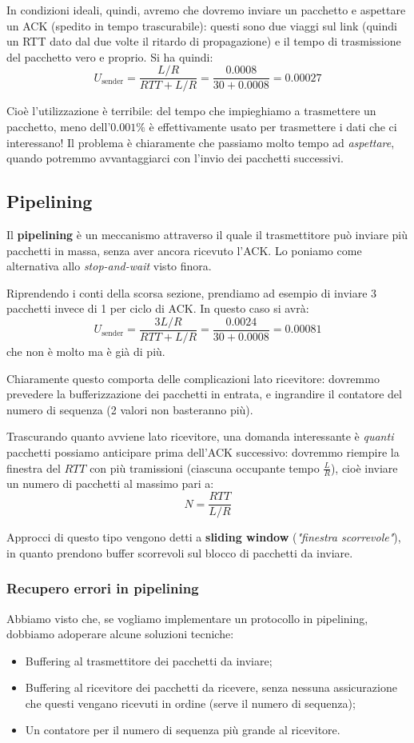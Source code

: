 \documentclass[a4paper,11pt]{article}
\begin{document}
In condizioni ideali, quindi, avremo che dovremo inviare un pacchetto e aspettare un ACK (spedito in tempo trascurabile): questi sono due viaggi sul link (quindi un RTT dato dal due volte il ritardo di propagazione) e il tempo di trasmissione del pacchetto vero e proprio.
Si ha quindi:
$$
U_{\text{sender}} = \frac{ L/R }{ RTT + L/R } = \frac{0.0008}{30 + 0.0008} = 0.00027
$$

Cioè l'utilizzazione è terribile: del tempo che impieghiamo a trasmettere un pacchetto, meno dell'$0.001\%$ è effettivamente usato per trasmettere i dati che ci interessano!
Il problema è chiaramente che passiamo molto tempo ad \textit{aspettare}, quando potremmo avvantaggiarci con l'invio dei pacchetti successivi.

\subsection{Pipelining}
Il \textbf{pipelining} è un meccanismo attraverso il quale il trasmettitore può inviare più pacchetti in massa, senza aver ancora ricevuto l'ACK.
Lo poniamo come alternativa allo \textit{stop-and-wait} visto finora.

Riprendendo i conti della scorsa sezione, prendiamo ad esempio di inviare 3 pacchetti invece di 1 per ciclo di ACK. In questo caso si avrà:
$$
U_{\text{sender}} = \frac{ 3 L/R }{ RTT + L/R } = \frac{0.0024}{30 + 0.0008} = 0.00081
$$
che non è molto ma è già di più.

Chiaramente questo comporta delle complicazioni lato ricevitore: dovremmo prevedere la bufferizzazione dei pacchetti in entrata, e ingrandire il contatore del numero di sequenza (2 valori non basteranno più).

Trascurando quanto avviene lato ricevitore, una domanda interessante è \textit{quanti} pacchetti possiamo anticipare prima dell'ACK successivo: dovremmo riempire la finestra del $RTT$ con più tramissioni (ciascuna occupante tempo $\frac{L}{R}$), cioè inviare un numero di pacchetti al massimo pari a:
$$
N = \frac{RTT}{L / R}
$$

Approcci di questo tipo vengono detti a \textbf{sliding window} (\textit{"finestra scorrevole"}), in quanto prendono buffer scorrevoli sul blocco di pacchetti da inviare.

\subsubsection{Recupero errori in pipelining}
Abbiamo visto che, se vogliamo implementare un protocollo in pipelining, dobbiamo adoperare alcune soluzioni tecniche:
\begin{itemize}
	\item Buffering al trasmettitore dei pacchetti da inviare;
	\item Buffering al ricevitore dei pacchetti da ricevere, senza nessuna assicurazione che questi vengano ricevuti in ordine (serve il numero di sequenza);
	\item Un contatore per il numero di sequenza più grande al ricevitore.
\end{itemize}
\end{document}
